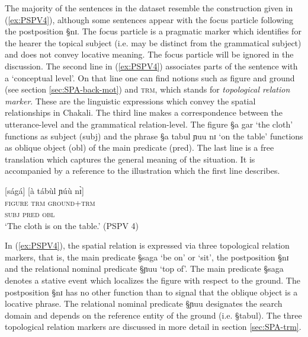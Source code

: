 The majority of the  sentences in the dataset resemble the construction given in
(\ref{ex:PSPV4}), although some sentences appear with the focus particle
following the postposition {\S nɪ}. The
focus particle is a pragmatic marker which identifies for the hearer the topical
subject (i.e. may be distinct from the grammatical subject) and does not convey
locative meaning. The focus particle will be ignored in the discussion. 
The second line  in (\ref{ex:PSPV4}) associates parts of the sentence with a
`conceptual level'. On
that line one can find notions such as figure and ground (see section
\ref{sec:SPA-back-mot}) and \textsc{trm}, which stands for {\it topological
relation marker}. These are the linguistic expressions which convey  the 
spatial
relationships in Chakali. The third line makes a correspondence between the
utterance-level and the grammatical relation-level. The figure {\S a gar} `the
 cloth'  functions as subject ({\sc subj}) and the phrase {\S a tabul ɲuu nɪ}
`on the table' functions as oblique object  ({\sc obl}) of the main
predicate  ({\sc pred}). The last line is a free translation which captures  the
general meaning of the situation. It is accompanied by a reference to the
illustration which the first line describes.



\begin{exe}
\ex\label{ex:PSPV4}
\glll {[à gár]} {[ságá]} {[à tábùl ɲúù nɪ̀]}\\
\textsc{figure} \textsc{trm} {\textsc{ground}+\textsc{trm}}\\
 \textsc{subj}   \textsc{pred} \textsc{obl}\\
\glt `The cloth is on the table.' (PSPV 4)
\end{exe}


In (\ref{ex:PSPV4}), the spatial relation is expressed via three topological
relation markers, that is,  the main predicate {\S saga} `be on' or `sit', the
postposition  {\S nɪ} and the relational nominal predicate {\S ɲuu} `top of'.
The main predicate  {\S saga}  denotes a stative event which  localizes the
figure with respect to the ground.  The postposition  {\S nɪ} has no other
function than to signal that the oblique object is a locative phrase. The
relational nominal predicate {\S ɲuu} designates the search domain and depends
on the reference entity of the ground (i.e. {\S tabul}). The three topological
relation markers are discussed in more detail in section \ref{sec:SPA-trm}.



